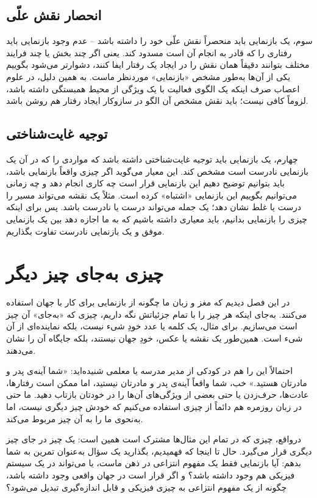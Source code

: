 \subsection{انحصار نقش علّی}
\label{sub:criterion-exclusivity}

سوم، یک بازنمایی باید منحصراً نقش علّی خود را داشته باشد -- عدم وجود بازنمایی باید رفتاری را که قادر به انجام آن است مسدود کند. یعنی اگر چند بخش یا چند فرایند مختلف بتوانند دقیقاً همان نقش را در ایجاد یک رفتار ایفا کنند، دشوارتر می‌شود بگوییم یکی از آن‌ها به‌طور مشخص «بازنمایی» موردنظر ماست. به همین دلیل، در علوم اعصاب صرف اینکه یک الگوی فعالیت با یک ویژگی از محیط همبستگی داشته باشد، لزوماً کافی نیست؛ باید نقش مشخص آن الگو در سازوکار ایجاد رفتار هم روشن باشد.
\newpage
\subsection{توجیه غایت‌شناختی}
\label{sub:criterion-teleological}

چهارم، یک بازنمایی باید توجیه غایت‌شناختی داشته باشد که مواردی را که در آن یک بازنمایی نادرست است مشخص کند. این معیار می‌گوید اگر چیزی واقعاً بازنمایی باشد، باید بتوانیم توضیح دهیم این بازنمایی قرار است چه کاری انجام دهد و چه زمانی می‌توانیم بگوییم این بازنمایی «اشتباه» کرده است. مثلاً یک نقشه می‌تواند مسیر را درست یا غلط نشان دهد؛ یک جمله می‌تواند درست یا نادرست باشد. پس برای اینکه چیزی را بازنمایی بدانیم، باید معیاری داشته باشیم که به ما اجازه دهد بین یک بازنمایی موفق و یک بازنمایی نادرست تفاوت بگذاریم.
\newpage
\section{چیزی به‌جای چیز دیگر}
\label{sec:something-in-place-of-another}

در این فصل دیدیم که مغز و زبان ما چگونه از بازنمایی برای کار با جهان استفاده می‌کنند. به‌جای اینکه هر چیز را با تمام جزئیاتش نگه داریم، چیزی که «به‌جای» آن چیز است می‌سازیم. برای مثال، یک کلمه یا عدد خودِ شیء نیست، بلکه نماینده‌ای از آن شیء است. همین‌طور یک نقشه یا عکس، خودِ جهان نیستند، بلکه جایگاه آن را نشان می‌دهند.

احتمالاً این را هم در کودکی از مدیر مدرسه یا معلمی شنیده‌اید: «شما آینه‌ی پدر و مادرتان هستید.» خب، شما واقعاً آینه‌ی پدر و مادرتان نیستید، اما ممکن است رفتارها، عادت‌ها، حرف‌زدن یا حتی بعضی از ویژگی‌های آن‌ها را در خودتان بازتاب دهید. ما حتی در زبان روزمره هم دائماً از چیزی استفاده می‌کنیم که خودش چیز دیگری نیست، اما به‌نحوی ما را به آن چیز مربوط می‌کند.

درواقع، چیزی که در تمام این مثال‌ها مشترک است همین است: یک چیز در جای چیز دیگری قرار می‌گیرد. حال تا اینجا که فهمیدیم، بگذارید یک سؤال به‌عنوان تمرین به شما بدهم: آیا بازنمایی فقط یک مفهوم انتزاعی در ذهن ماست، یا می‌تواند در یک سیستم فیزیکی هم وجود داشته باشد؟ و اگر قرار است در جهان واقعی وجود داشته باشد، چگونه از یک مفهوم انتزاعی به چیزی فیزیکی و قابل اندازه‌گیری تبدیل می‌شود؟


